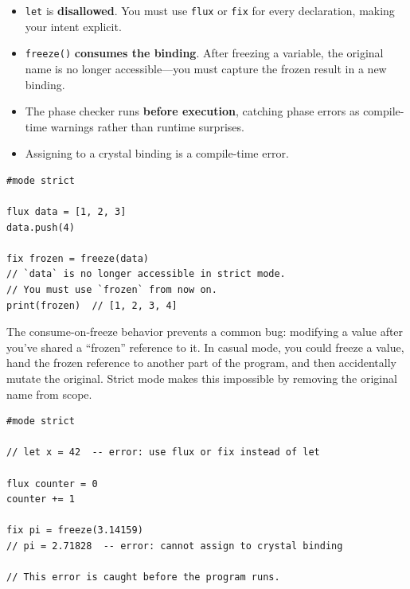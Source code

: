\begin{itemize}
  \item \lstinline|let| is \textbf{disallowed}. You must use \lstinline|flux| or \lstinline|fix| for every declaration, making your intent explicit.
  \item \lstinline|freeze()| \textbf{consumes the binding}. After freezing a variable, the original name is no longer accessible---you must capture the frozen result in a new binding.
  \item The phase checker runs \textbf{before execution}, catching phase errors as compile-time warnings rather than runtime surprises.
  \item Assigning to a crystal binding is a compile-time error.
\end{itemize}

\begin{lstlisting}[language=Lattice, caption={Strict mode: explicit and consuming}]
#mode strict

flux data = [1, 2, 3]
data.push(4)

fix frozen = freeze(data)
// `data` is no longer accessible in strict mode.
// You must use `frozen` from now on.
print(frozen)  // [1, 2, 3, 4]
\end{lstlisting}

The consume-on-freeze behavior prevents a common bug: modifying a value after you've shared a ``frozen'' reference to it.
In casual mode, you could freeze a value, hand the frozen reference to another part of the program, and then accidentally mutate the original.
Strict mode makes this impossible by removing the original name from scope.

\begin{lstlisting}[language=Lattice, caption={Strict mode catches errors early}]
#mode strict

// let x = 42  -- error: use flux or fix instead of let

flux counter = 0
counter += 1

fix pi = freeze(3.14159)
// pi = 2.71828  -- error: cannot assign to crystal binding

// This error is caught before the program runs.
\end{lstlisting}

